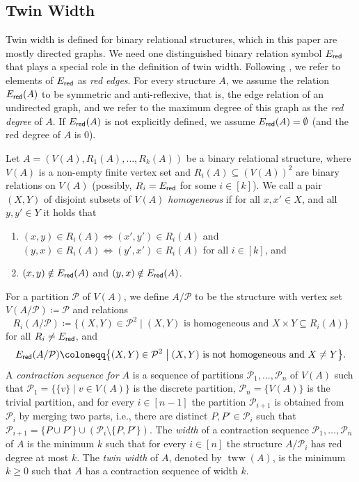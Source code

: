 \PassOptionsToPackage{dvipsnames,svgnames}{xcolor}\documentclass[10pt,a4paper]{article}
\newcommand{\CP}{{\mathcal P}}
\newcommand{\bigmid}{\;\big|\;}
\newcommand{\Ered}{E_{\sf red}}
\DeclareMathOperator{\tww}{tww}
\begin{document}
\subsection{Twin Width}
\label{sec:tww}

Twin width \cite{BonnetKTW22} is defined for binary relational structures, which in this paper are mostly directed graphs.
We need one distinguished binary relation symbol $\Ered$ that plays a special role in the definition of twin width.
Following \cite{BonnetKTW22}, we refer to elements of $\Ered$ as \emph{red edges}.
For every structure $A$, we assume the relation $\Ered(A)$ to be symmetric and anti-reflexive, that is, the edge relation of an undirected graph, and we refer to the maximum degree of this graph as the \emph{red degree} of $A$.
If $\Ered(A)$ is not explicitly defined, we assume $\Ered(A)=\emptyset$ (and the red degree of $A$ is $0$).

Let $A = (V(A),R_1(A),\dots,R_k(A))$ be a binary relational structure, where $V(A)$ is a non-empty finite vertex set and $R_i(A) \subseteq (V(A))^2$ are binary relations on $V(A)$ (possibly, $R_i=\Ered$ for some $i \in [k]$).
We call a pair $(X,Y)$ of disjoint subsets of $V(A)$ \emph{homogeneous} if for all $x,x'\in X$, and all $y,y'\in Y$ it holds that
\begin{enumerate}[label = (\roman*)]
 \item $(x,y)\in R_i(A) \Leftrightarrow (x',y') \in R_i(A)$ and $(y,x) \in R_i(A) \Leftrightarrow (y',x') \in R_i(A)$ for all $i \in [k]$, and
 \item $(x,y) \notin \Ered(A)$ and $(y,x) \notin \Ered(A)$.
\end{enumerate}
For a partition $\CP$ of $V(A)$, we define $A/\CP$ to be the structure with vertex set $V(A/\CP) \coloneqq \CP$ and relations
\[R_i(A/\CP) \coloneqq \big\{(X,Y) \in \CP^2 \bigmid (X,Y) \text{ is homogeneous and } X \times Y\subseteq R_i(A)\big\}\]
for all $R_i \neq \Ered$, and
\[\Ered(A/\CP) \coloneqq \big\{(X,Y) \in \CP^2 \bigmid (X,Y) \text{ is not homogeneous and } X \neq Y\big\}.\]
A \emph{contraction sequence for $A$} is a sequence of partitions
$\CP_1,\dots,\CP_n$ of $V(A)$ such that $\CP_1 = \{\{v\} \mid v \in V(A)\}$ is the discrete partition, $\CP_n = \{V(A)\}$ is the trivial partition,
and for every $i \in [n-1]$ the partition $\CP_{i+1}$ is obtained from $\CP_i$ by merging two parts, i.e.,
there are distinct $P,P' \in \CP_i$ such that $\CP_{i+1} = \{P \cup P'\} \cup (\CP_{i} \setminus \{P,P'\})$.
The \emph{width} of a contraction sequence $\CP_1,\dots,\CP_n$ of $A$ is the minimum $k$ such that for every $i \in [n]$ the structure $A/\CP_i$ has red degree at most $k$.
The \emph{twin width} of $A$, denoted by $\tww(A)$, is the minimum $k \geq 0$ such that $A$ has a contraction sequence of width $k$.
\end{document}
